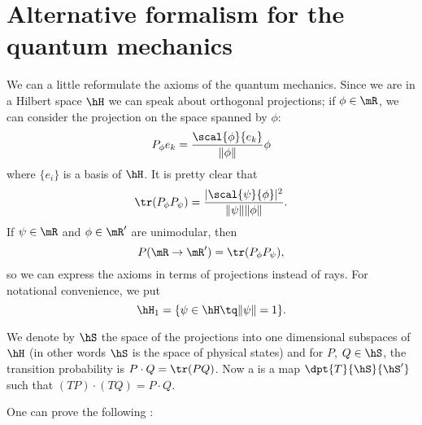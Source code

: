 \section{Alternative formalism for the quantum mechanics}\label{app:Wigner}

We can a little reformulate the axioms of the quantum mechanics. Since we are in a Hilbert space $\hH$ we can speak about orthogonal projections; if $\phi\in\mR$, we can consider the projection on the space spanned by $\phi$:
\[
   P_{\phi}e_k=\frac{\scal{\phi}{e_k}}{\|\phi\|}\phi
\]
where $\{e_i\}$ is a basis of $\hH$. It is pretty clear that 
\begin{equation}
\tr(P_{\phi} P_{\psi})=\frac{| \scal{\psi}{\phi} |^2}{\|\psi\|\|\phi\|}.
\end{equation}
If $\psi\in\mR$ and $\phi\in\mR'$ are unimodular, then
\begin{equation}
P(\mR\to\mR')=\tr(P_{\phi}P_{\psi}),
\end{equation}
so we can express the axioms in terms of projections instead of rays. For notational convenience, we put
\begin{equation}
\hH_1=\{\psi\in\hH\tq\|\psi\|=1\}.
\end{equation}

We denote by $\hS$ the space of the projections into one dimensional subspaces of $\hH$ (in other words $\hS$ is the space of physical states) and for $P$, $Q\in\hS$, the transition probability is $P\cdot Q=\tr(PQ)$.
Now a  is a map $\dpt{T}{\hS}{\hS'}$ such that $(TP)\cdot(TQ)=P\cdot Q$.

One can prove the following :

